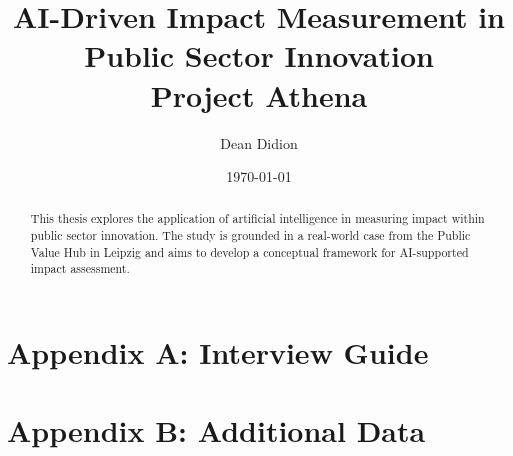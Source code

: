 \documentclass[12pt]{report}
\title{AI-Driven Impact Measurement in Public Sector Innovation\\ \large Project Athena}
\author{Dean Didion}
\date{\today}
\begin{document}
\maketitle

\begin{abstract}
This thesis explores the application of artificial intelligence in measuring impact within public sector innovation. The study is grounded in a real-world case from the Public Value Hub in Leipzig and aims to develop a conceptual framework for AI-supported impact assessment.
\end{abstract}

\tableofcontents
\newpage

















\appendix
\chapter{Appendix A: Interview Guide}
\lipsum[17]

\chapter{Appendix B: Additional Data}
\lipsum[18]
\end{document}
